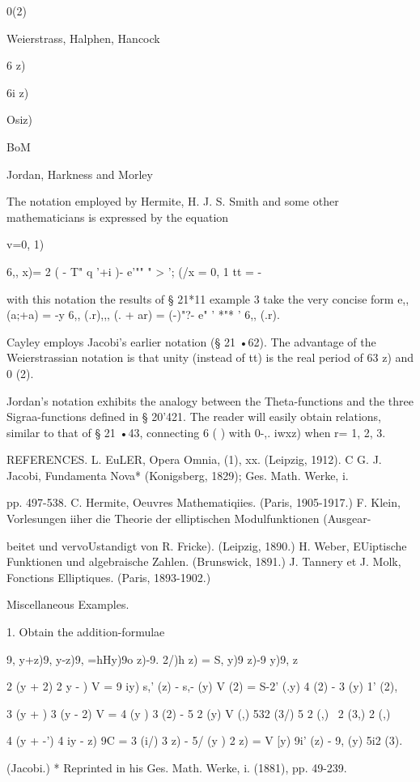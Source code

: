  0(2)

Weierstrass, Halphen, Hancock

6 z)

6i z)

Osiz)

BoM

Jordan, Harkness and Morley

The notation employed by Hermite, H. J. S. Smith and some other
mathematicians is expressed by the equation

v=0, 1)

6,, x)= 2 ( - T" q '+i )- e'"" " > '; (/x = 0, 1 tt = -

with this notation the results of § 21*11 example 3 take the very
concise form e,,(a;+a) = -y 6,, (.r),,, (. + ar) = (-)"?- e" '
*"* ' 6,, (.r).

Cayley employs Jacobi's earlier notation (§ 21 •62). The advantage of
the Weierstrassian notation is that unity (instead of tt) is the real
period of 63 z) and 0 (2).

Jordan's notation exhibits the analogy between the Theta-functions and
the three Sigraa-functions defined in § 20'421. The reader will easily
obtain relations, similar to that of § 21 •43, connecting 6 ( ) with
0-,. iwxz) when r= 1, 2, 3.

REFERENCES. L. EuLER, Opera Omnia, (1), xx. (Leipzig, 1912). C G. J.
Jacobi, Fundamenta Nova* (Konigsberg, 1829); Ges. Math. Werke, i.

pp. 497-538. C. Hermite, Oeuvres Mathematiqiies. (Paris, 1905-1917.)
F. Klein, Vorlesungen iiher die Theorie der elliptischen
Modulfunktionen (Ausgear-

beitet und vervoUstandigt von R. Fricke). (Leipzig, 1890.) H. Weber,
EUiptische Funktionen und algebraische Zahlen. (Brunswick, 1891.) J.
Tannery et J. Molk, Fonctions Elliptiques. (Paris, 1893-1902.)

Miscellaneous Examples.

1. Obtain the addition-formulae

9, y+z)9, y-z)9, =hHy)9o z)-9. 2/)h z) = S, y)9 z)-9 y)9, z\

 2 (y + 2) 2 y - ) V = 9 iy) s,' (z) - s,- (y) V (2) = S-2' (.y) 4 (2)
- 3 (y) 1' (2),

 3 (y + ) 3 (y - 2) V = 4 (y ) 3 (2) - 5 2 (y) V (,) 532 (3/) 5 2 (,)
\ 2 (3,) 2 (,)

 4 (y + -') 4 iy - z) 9C = 3 (i/) 3 z) - 5/ (y ) 2 z) = V [y) 9i' (z)
- 9, (y) 5i2 (3).

(Jacobi.) * Reprinted in his Ges. Math. Werke, i. (1881), pp. 49-239.

